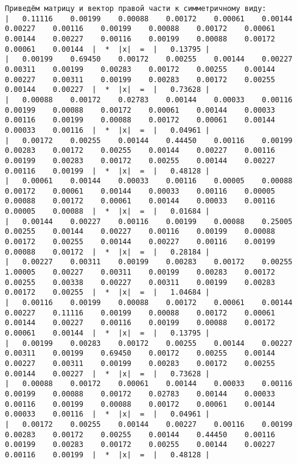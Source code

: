 \documentclass[a4paper,12pt,titlepage,finall]{article}
\begin{document}
\begin{verbatim}
Приведём матрицу и вектор правой части к симметричному виду:
|   0.11116    0.00199    0.00088    0.00172    0.00061    0.00144    0.00227    0.00116    0.00199    0.00088    0.00172    0.00061    0.00144    0.00227    0.00116    0.00199    0.00088    0.00172    0.00061    0.00144  |  *  |x|  =  |   0.13795 |
|   0.00199    0.69450    0.00172    0.00255    0.00144    0.00227    0.00311    0.00199    0.00283    0.00172    0.00255    0.00144    0.00227    0.00311    0.00199    0.00283    0.00172    0.00255    0.00144    0.00227  |  *  |x|  =  |   0.73628 |
|   0.00088    0.00172    0.02783    0.00144    0.00033    0.00116    0.00199    0.00088    0.00172    0.00061    0.00144    0.00033    0.00116    0.00199    0.00088    0.00172    0.00061    0.00144    0.00033    0.00116  |  *  |x|  =  |   0.04961 |
|   0.00172    0.00255    0.00144    0.44450    0.00116    0.00199    0.00283    0.00172    0.00255    0.00144    0.00227    0.00116    0.00199    0.00283    0.00172    0.00255    0.00144    0.00227    0.00116    0.00199  |  *  |x|  =  |   0.48128 |
|   0.00061    0.00144    0.00033    0.00116    0.00005    0.00088    0.00172    0.00061    0.00144    0.00033    0.00116    0.00005    0.00088    0.00172    0.00061    0.00144    0.00033    0.00116    0.00005    0.00088  |  *  |x|  =  |   0.01684 |
|   0.00144    0.00227    0.00116    0.00199    0.00088    0.25005    0.00255    0.00144    0.00227    0.00116    0.00199    0.00088    0.00172    0.00255    0.00144    0.00227    0.00116    0.00199    0.00088    0.00172  |  *  |x|  =  |   0.28184 |
|   0.00227    0.00311    0.00199    0.00283    0.00172    0.00255    1.00005    0.00227    0.00311    0.00199    0.00283    0.00172    0.00255    0.00338    0.00227    0.00311    0.00199    0.00283    0.00172    0.00255  |  *  |x|  =  |   1.04684 |
|   0.00116    0.00199    0.00088    0.00172    0.00061    0.00144    0.00227    0.11116    0.00199    0.00088    0.00172    0.00061    0.00144    0.00227    0.00116    0.00199    0.00088    0.00172    0.00061    0.00144  |  *  |x|  =  |   0.13795 |
|   0.00199    0.00283    0.00172    0.00255    0.00144    0.00227    0.00311    0.00199    0.69450    0.00172    0.00255    0.00144    0.00227    0.00311    0.00199    0.00283    0.00172    0.00255    0.00144    0.00227  |  *  |x|  =  |   0.73628 |
|   0.00088    0.00172    0.00061    0.00144    0.00033    0.00116    0.00199    0.00088    0.00172    0.02783    0.00144    0.00033    0.00116    0.00199    0.00088    0.00172    0.00061    0.00144    0.00033    0.00116  |  *  |x|  =  |   0.04961 |
|   0.00172    0.00255    0.00144    0.00227    0.00116    0.00199    0.00283    0.00172    0.00255    0.00144    0.44450    0.00116    0.00199    0.00283    0.00172    0.00255    0.00144    0.00227    0.00116    0.00199  |  *  |x|  =  |   0.48128 |

\end{verbatim}
\end{document}
